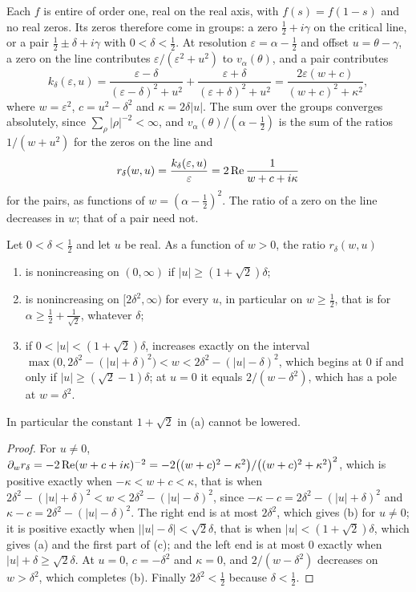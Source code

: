 Each $f$ is entire of order one, real on the real axis, with $f(s)=f(1-s)$ and no real zeros. Its zeros therefore come in groups: a zero $\frac12+i\gamma$ on the critical line, or a pair $\frac12\pm\delta+i\gamma$ with $0<\delta<\frac12$. At resolution $\varepsilon=\alpha-\frac12$ and offset $u=\theta-\gamma$, a zero on the line contributes $\varepsilon/(\varepsilon^2+u^2)$ to $v_\alpha(\theta)$, and a pair contributes
\begin{equation}\label{eq:dbeta:pair}
k_\delta(\varepsilon,u)=\frac{\varepsilon-\delta}{(\varepsilon-\delta)^2+u^2}+\frac{\varepsilon+\delta}{(\varepsilon+\delta)^2+u^2}=\frac{2\varepsilon(w+c)}{(w+c)^2+\kappa^2},
\end{equation}
where $w=\varepsilon^2$, $c=u^2-\delta^2$ and $\kappa=2\delta|u|$. The sum over the groups converges absolutely, since $\sum_\rho|\rho|^{-2}<\infty$, and $v_\alpha(\theta)/(\alpha-\frac12)$ is the sum of the ratios $1/(w+u^2)$ for the zeros on the line and
\[
r_\delta(w,u)=\frac{k_\delta(\varepsilon,u)}\varepsilon=2\operatorname{Re}\frac1{w+c+i\kappa}
\]
for the pairs, as functions of $w=(\alpha-\frac12)^2$. The ratio of a zero on the line decreases in $w$; that of a pair need not.

\begin{lemma}[Comparison]\label{lem:dbeta:comp}
Let $0<\delta<\frac12$ and let $u$ be real. As a function of $w>0$, the ratio $r_\delta(w,u)$
\begin{enumerate}
\item[(a)] is nonincreasing on $(0,\infty)$ if $|u|\ge(1+\sqrt2)\delta$;
\item[(b)] is nonincreasing on $[2\delta^2,\infty)$ for every $u$, in particular on $w\ge\frac12$, that is for $\alpha\ge\frac12+\frac1{\sqrt2}$, whatever $\delta$;
\item[(c)] if $0<|u|<(1+\sqrt2)\delta$, increases exactly on the interval $\max\big(0,2\delta^2-(|u|+\delta)^2\big)<w<2\delta^2-(|u|-\delta)^2$, which begins at $0$ if and only if $|u|\ge(\sqrt2-1)\delta$; at $u=0$ it equals $2/(w-\delta^2)$, which has a pole at $w=\delta^2$.
\end{enumerate}
In particular the constant $1+\sqrt2$ in (a) cannot be lowered.
\end{lemma}

\begin{proof}
For $u\ne0$, $\partial_wr_\delta=-2\operatorname{Re}(w+c+i\kappa)^{-2}=-2\big((w+c)^2-\kappa^2\big)/\big((w+c)^2+\kappa^2\big)^2$, which is positive exactly when $-\kappa<w+c<\kappa$, that is when $2\delta^2-(|u|+\delta)^2<w<2\delta^2-(|u|-\delta)^2$, since $-\kappa-c=2\delta^2-(|u|+\delta)^2$ and $\kappa-c=2\delta^2-(|u|-\delta)^2$. The right end is at most $2\delta^2$, which gives (b) for $u\ne0$; it is positive exactly when $\big||u|-\delta\big|<\sqrt2\delta$, that is when $|u|<(1+\sqrt2)\delta$, which gives (a) and the first part of (c); and the left end is at most $0$ exactly when $|u|+\delta\ge\sqrt2\delta$. At $u=0$, $c=-\delta^2$ and $\kappa=0$, and $2/(w-\delta^2)$ decreases on $w>\delta^2$, which completes (b). Finally $2\delta^2<\frac12$ because $\delta<\frac12$.
\end{proof}

